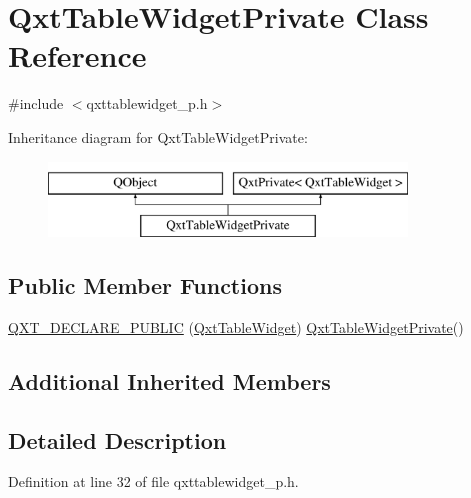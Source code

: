 \hypertarget{class_qxt_table_widget_private}{\section{Qxt\-Table\-Widget\-Private Class Reference}
\label{class_qxt_table_widget_private}
}


{\ttfamily \#include $<$qxttablewidget\-\_\-p.\-h$>$}

Inheritance diagram for Qxt\-Table\-Widget\-Private\-:\begin{figure}[H]
\begin{center}
\leavevmode
\includegraphics[height=2.000000cm]{class_qxt_table_widget_private}
\end{center}
\end{figure}
\subsection*{Public Member Functions}
\begin{DoxyCompactItemize}
\item 
\hyperlink{class_qxt_table_widget_private_acd90361417f9939b2b6526cec354f731}{Q\-X\-T\-\_\-\-D\-E\-C\-L\-A\-R\-E\-\_\-\-P\-U\-B\-L\-I\-C} (\hyperlink{class_qxt_table_widget}{Qxt\-Table\-Widget}) \hyperlink{class_qxt_table_widget_private}{Qxt\-Table\-Widget\-Private}()
\end{DoxyCompactItemize}
\subsection*{Additional Inherited Members}


\subsection{Detailed Description}


Definition at line 32 of file qxttablewidget\-\_\-p.\-h.



